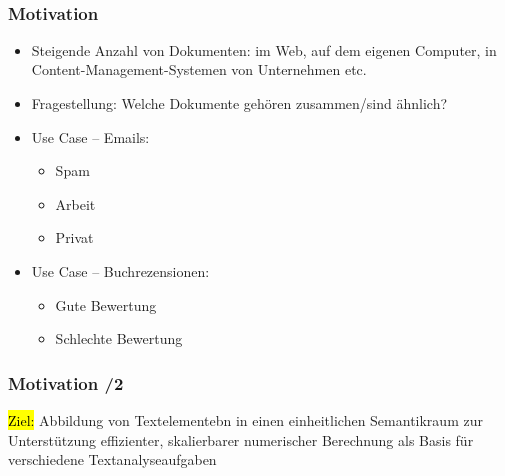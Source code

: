 \
\begin{frame}
    \frametitle{Motivation}

    \begin{itemize}
    \item Steigende Anzahl von Dokumenten: im Web, auf dem eigenen Computer, in Content-Management-Systemen von Unternehmen etc.
    \item Fragestellung: Welche Dokumente gehören zusammen/sind ähnlich?
    \item Use Case -- Emails:
    \begin{itemize}
    \item Spam
    \item Arbeit
    \item Privat
    \end{itemize}
    \item Use Case -- Buchrezensionen:
    \begin{itemize}
    \item Gute Bewertung
    \item Schlechte Bewertung
    \end{itemize}
    \end{itemize}
\end{frame}


\begin{frame}
    \frametitle{Motivation /2}

\hl{Ziel:} Abbildung von Textelementebn in einen einheitlichen Semantikraum zur Unterstützung effizienter, skalierbarer numerischer Berechnung
als Basis für verschiedene Textanalyseaufgaben

\end{frame}

    
